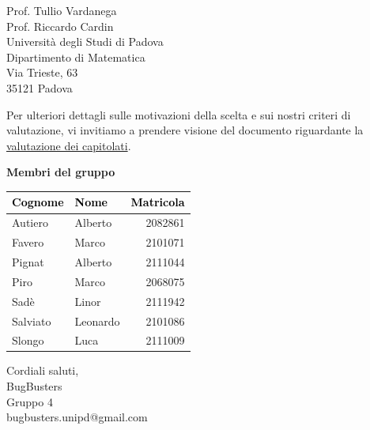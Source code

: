 \documentclass[a4paper,11pt]{letter}
\makeatletter
\newcommand{\GruppoFirma}{BugBusters\\Gruppo 4\\bugbusters.unipd@gmail.com}
\makeatother
\begin{document}
\begin{letter}{Prof. Tullio Vardanega\\Prof. Riccardo Cardin\\Universit\`a degli Studi di Padova\\Dipartimento di Matematica\\Via Trieste, 63\\35121 Padova}
\vspace{0.8em}

Per ulteriori dettagli sulle motivazioni della scelta e sui nostri criteri di valutazione, 
vi invitiamo a prendere visione del documento riguardante la \href{https://bugbustersunipd.github.io/BugBusterSite/assets/docs/SCELTA_CAPITOLATO/Resoconto_capitolati.pdf}{valutazione dei capitolati}.


\vspace{1em}

	\textbf{Membri del gruppo}
\begin{center}
\setlength{\arrayrulewidth}{0.8pt}
\begin{tabular}{|l|l|r|}
\hline
\rowcolor{primarycolor!20}
	\textcolor{black}{\textbf{Cognome}} & \textcolor{black}{\textbf{Nome}} & \textcolor{black}{\textbf{Matricola}} \\
\hline
Autiero & Alberto & 2082861 \\
\hline
Favero & Marco & 2101071 \\
\hline
Pignat & Alberto & 2111044 \\
\hline
Piro & Marco & 2068075 \\
\hline
Sad\`e & Linor & 2111942 \\
\hline
Salviato & Leonardo & 2101086 \\
\hline
Slongo & Luca & 2111009 \\
\hline
\end{tabular}
\end{center}


\vspace{1.2em}

\closing{Cordiali saluti, \vspace{1.2em} \\ \GruppoFirma}

\end{letter}
\end{document}
